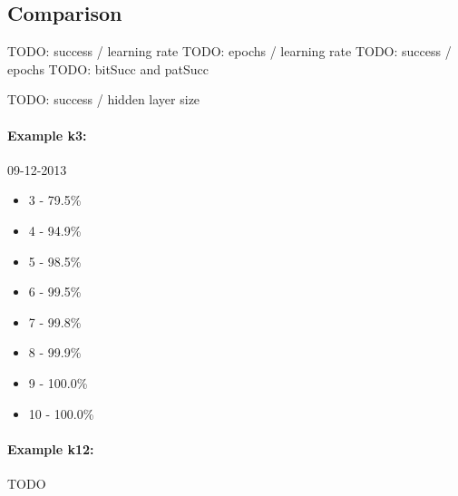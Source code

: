 

\subsection{Comparison} 

TODO: success / learning rate 
TODO: epochs / learning rate 
TODO: success / epochs 
TODO: bitSucc and patSucc

TODO: success / hidden layer size 
\paragraph{Example k3:}
09-12-2013
\begin{itemize}  
\item 3  - 79.5\%
\item 4  - 94.9\%
\item 5  - 98.5\%
\item 6  - 99.5\%
\item 7  - 99.8\%
\item 8  - 99.9\%
\item 9  - 100.0\%
\item 10  - 100.0\%
\end{itemize} 

\paragraph{Example k12:}
TODO 

